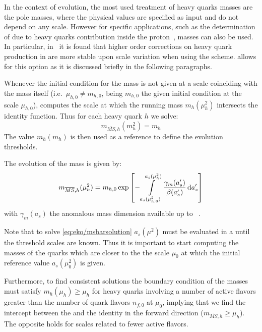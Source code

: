 In the context of \pdf{} evolution, the most used treatment of heavy quarks masses are the pole masses,
where the physical values are specified as input and do not depend on any scale.
However for specific applications, such as the determination of \mhou{} due to heavy quarks contribution 
inside the proton~\cite{Ball:2016neh}, \msbar{} masses can also be used.
In particular, in~\cite{Alekhin:2010sv} it is found that higher order corrections on heavy quark production
in \dis{} are more stable upon scale variation when using the \msbar{} scheme.
\eko{} allows for this option as it is discussed briefly in the following paragraphs.

Whenever the initial condition for the mass is not given at a scale coinciding with
the mass itself (i.e.\ $\mu_{h,0} \neq m_{h,0}$, being $m_{h,0}$ the given initial condition
at the scale $\mu_{h,0}$),
\eko{} computes the scale at which the running mass $m_{h}(\mu_h^2)$ intersects
the identity function.
Thus for each heavy quark $h$ we solve:
%
\begin{equation}
    m_{\overline{MS},h}(m_h^2) = m_h
\end{equation}
The value $m_h(m_h)$ is then used as a reference to define the evolution thresholds.

The evolution of the \msbar{} mass is given by:
%
\begin{equation}
    m_{\overline{MS},h}(\mu_h^2) = m_{h,0} \exp\qty[ - \int\limits_{a_s(\mu_{h,0}^2)}^{a_s(\mu_h^2)} \frac{\gamma_m(a_s')}{\beta(a_s')} \dd{a_s'} ]
    \label{eq:eko/msbarsolution}
\end{equation}
%
with $\gamma_m(a_s)$ the \qcd{} anomalous mass dimension available up to 
\nnnlo{}~\cite{Vermaseren:1997fq,Schroder:2005hy,Chetyrkin:2005ia}.

Note that to solve \cref{eq:eko/msbarsolution} $a_s(\mu^2)$ must be evaluated in 
a \ffns{} until the threshold scales are known. Thus it is important
to start computing the \msbar{} masses of the quarks which are closer to the
the scale $\mu_{0}$ at which the initial reference value $a_s(\mu_{0}^2)$ is given. 

Furthermore, to find consistent solutions the boundary condition of the
\msbar{} masses must satisfy $m_h(\mu_h) \ge \mu_h$ for heavy quarks involving
a number of active flavors greater than the number of quark flavors $n_{f,0}$ at $\mu_{0}$, implying that we find
the intercept between the \rge{} and the identity in the forward direction ($m_{\overline{MS},h} \ge \mu_h$).
The opposite holds for scales related to fewer active flavors.
